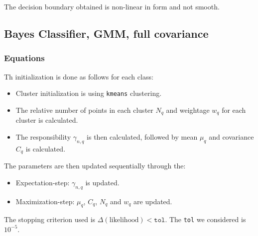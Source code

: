 \documentclass[11pt,a4paper]{article}
\newcommand{\noi}{\noindent}
\def\tt#1{\texttt{#1}}
\begin{document}
\noi
The decision boundary obtained is non-linear in form and not smooth. 

\subsection{Bayes Classifier, GMM, full covariance}
\subsubsection{Equations}
Th initialization is done as follows for each class:
\begin{itemize}
    \itemsep0em
    \item Cluster initialization is using \tt{kmeans} clustering.
    \item The relative number of points in each cluster $N_q$ and weightage $w_q$ for each cluster is calculated.
    \item The responsibility $\gamma_{n,q}$ is then calculated, followed by mean $\mu_q$ and covariance $C_q$ is calculated.
\end{itemize}

\noi
The parameters are then updated sequentially through the:
\begin{itemize}
    \itemsep0em
    \item Expectation-step: $\gamma_{n,q}$ is updated.
    \item Maximization-step: $\mu_q$, $C_q$, $N_q$ and $w_q$ are updated.
\end{itemize}

\noi
The stopping criterion used is $\Delta(\text{likelihood})<\tt{tol}$. The \tt{tol} we considered is $10^{-5}$.\\
\end{document}

